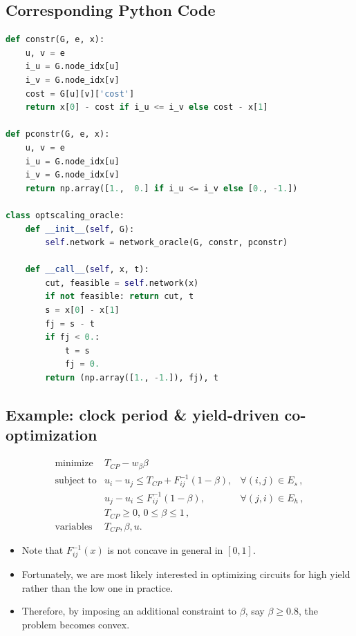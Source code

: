 \documentclass[]{article}
\providecommand{\tightlist}{%
  \setlength{\itemsep}{0pt}\setlength{\parskip}{0pt}}
\begin{document}
\hypertarget{corresponding-python-code-1}{%
\subsection{Corresponding Python
Code}\label{corresponding-python-code-1}}

\scriptsize

\begin{lstlisting}[language=Python]
def constr(G, e, x):
    u, v = e
    i_u = G.node_idx[u]
    i_v = G.node_idx[v]
    cost = G[u][v]['cost']
    return x[0] - cost if i_u <= i_v else cost - x[1]

def pconstr(G, e, x):
    u, v = e
    i_u = G.node_idx[u]
    i_v = G.node_idx[v]
    return np.array([1.,  0.] if i_u <= i_v else [0., -1.])

class optscaling_oracle:
    def __init__(self, G):
        self.network = network_oracle(G, constr, pconstr)

    def __call__(self, x, t):
        cut, feasible = self.network(x)
        if not feasible: return cut, t
        s = x[0] - x[1]
        fj = s - t
        if fj < 0.:
            t = s
            fj = 0.
        return (np.array([1., -1.]), fj), t
\end{lstlisting}

\hypertarget{example-clock-period-yield-driven-co-optimization}{%
\subsection{Example: clock period \& yield-driven
co-optimization}\label{example-clock-period-yield-driven-co-optimization}}

\[\begin{array}{cll}
   \text{minimize} &T_{CP} - w_\beta \beta \\
   \text{subject to} & u_i - u_j \le T_{CP} + F_{ij}^{-1}(1 - \beta), & \forall (i,j) \in E_s \,,\\
                     & u_j - u_i \le F_{ij}^{-1}(1 - \beta), & \forall (j,i) \in E_h \,, \\
                     & T_{CP} \ge 0, \, 0 \le \beta \le 1 \, , \\
    \text{variables} &T_{CP}, \beta, u.
   \end{array}\]

\begin{itemize}
\tightlist
\item
  Note that \(F_{ij}^{-1}(x)\) is not concave in general in \([0, 1]\).
\item
  Fortunately, we are most likely interested in optimizing circuits for
  high yield rather than the low one in practice.
\item
  Therefore, by imposing an additional constraint to \(\beta\), say
  \(\beta \geq 0.8\), the problem becomes convex.
\end{itemize}
\end{document}
